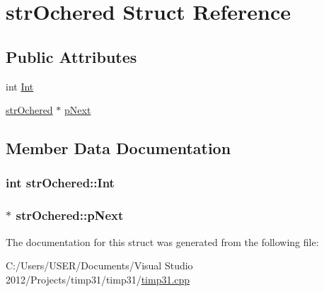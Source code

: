 \hypertarget{structstr_ochered}{\section{str\-Ochered \-Struct \-Reference}
\label{structstr_ochered}
}
\subsection*{\-Public \-Attributes}
\begin{DoxyCompactItemize}
\item 
int \hyperlink{structstr_ochered_aeae804a53e1b4855b3cd3ccce2331c7b}{\-Int}
\item 
\hyperlink{structstr_ochered}{str\-Ochered} $\ast$ \hyperlink{structstr_ochered_a4313b2c1ca2dc4cae5d49bd16410e96a}{p\-Next}
\end{DoxyCompactItemize}


\subsection{\-Member \-Data \-Documentation}
\hypertarget{structstr_ochered_aeae804a53e1b4855b3cd3ccce2331c7b}{
\subsubsection[{\-Int}]{\setlength{\rightskip}{0pt plus 5cm}int {\bf str\-Ochered\-::\-Int}}}\label{structstr_ochered_aeae804a53e1b4855b3cd3ccce2331c7b}
\hypertarget{structstr_ochered_a4313b2c1ca2dc4cae5d49bd16410e96a}{
\subsubsection[{p\-Next}]{$\ast$ {\bf str\-Ochered\-::p\-Next}}}\label{structstr_ochered_a4313b2c1ca2dc4cae5d49bd16410e96a}


\-The documentation for this struct was generated from the following file\-:\begin{DoxyCompactItemize}
\item 
\-C\-:/\-Users/\-U\-S\-E\-R/\-Documents/\-Visual Studio 2012/\-Projects/timp31/timp31/\hyperlink{timp31_8cpp}{timp31.\-cpp}\end{DoxyCompactItemize}
